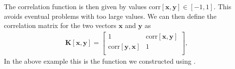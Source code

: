 \documentclass[letterpaper,10pt,english]{sphinxmanual}
\begin{document}
The correlation function is then given by values \(\mathrm{corr}[\boldsymbol{x},\boldsymbol{y}]
\in [-1,1]\). This avoids eventual problems with too large values. We
can then define the correlation matrix for the two vectors \(\boldsymbol{x}\)
and \(\boldsymbol{y}\) as
\begin{equation*}
\begin{split}
\boldsymbol{K}[\boldsymbol{x},\boldsymbol{y}] = \begin{bmatrix} 1 & \mathrm{corr}[\boldsymbol{x},\boldsymbol{y}] \\
                              \mathrm{corr}[\boldsymbol{y},\boldsymbol{x}] & 1 \\
             \end{bmatrix},
\end{split}
\end{equation*}
In the above example this is the function we constructed using .
\end{document}

